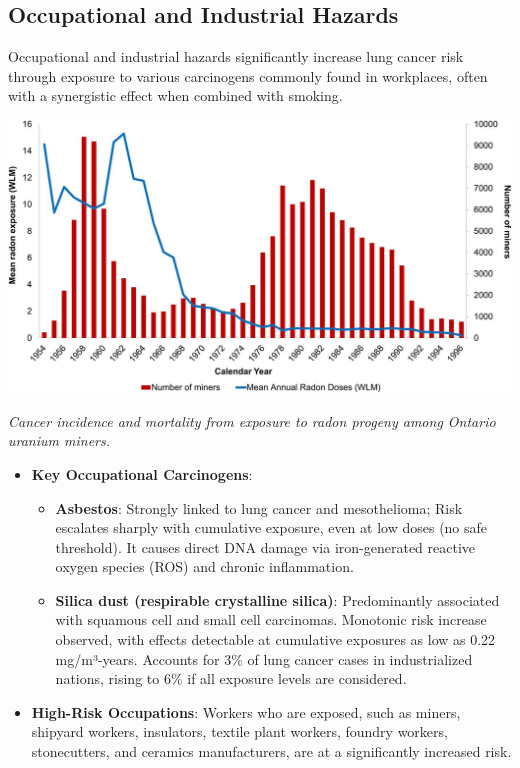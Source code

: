 \subsection{Occupational and Industrial Hazards}

Occupational and industrial hazards significantly increase lung cancer risk through exposure to 
various carcinogens commonly found in workplaces, often with a synergistic effect when combined 
with smoking.

\begin{center} 
    \includegraphics[width=\textwidth]{../assets/02-etiology/mortality_from_exposure_to_uranium.jpg}

    \small\textit{Cancer incidence and mortality from exposure to radon progeny among Ontario uranium 
    miners. \cite{Navaranjan838}}
\end{center} 

\begin{itemize}
    \item \textbf{Key Occupational Carcinogens}: 
    \begin{itemize}
        \item \textbf{Asbestos}: Strongly linked to lung cancer and mesothelioma; Risk escalates 
        sharply with cumulative exposure, even at low doses (no safe threshold). It causes direct 
        DNA damage via iron-generated reactive oxygen species (ROS) and chronic inflammation. 
        \cite{9498906}

        \item \textbf{Silica dust (respirable crystalline silica)}: Predominantly associated with 
        squamous cell and small cell carcinomas. Monotonic risk increase observed, with effects 
        detectable at cumulative exposures as low as 0.22 mg/m³-years. Accounts for 3\% of lung 
        cancer cases in industrialized nations, rising to 6\% \cite{CEBP2010} if all exposure levels 
        are considered.
    \end{itemize}

    \item \textbf{High-Risk Occupations}: Workers who are exposed, such as miners, shipyard 
    workers, insulators, textile plant workers, foundry workers, stonecutters, and ceramics 
    manufacturers, are at a significantly increased risk. 
\end{itemize}

